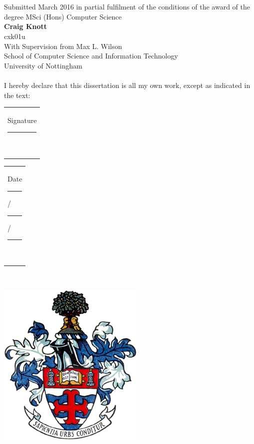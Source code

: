 \begin{center}
\ \\[1cm]
\LARGE{\textbf{\paperTitle}}\ \\[0.5cm]
\large{Submitted March 2016 in partial fulfilment of the conditions of the award of the degree MSci (Hons) Computer Science}
\ \\[1cm]
\large{\textbf{Craig Knott}} \ \\
\large{cxk01u}\ \\[0.3cm]

With Supervision from Max L. Wilson\\[0.3cm]

School of Computer Science and Information Technology \ \\
University of Nottingham \ \\
 \ \\[0.5cm]
I hereby declare that this dissertation is all my own work, except as indicated in the text: \ \\[1cm]
\end{center}

\begin{Large}
\begin{center}
\begin{tabular}{l}
Signature \rule{5cm}{1pt} \ \\[0.2cm]
\end{tabular}
\end{center}

\begin{center}
\begin{tabular}{l}
Date \rule{1.5cm}{1pt}/\rule{1.5cm}{1pt}/\rule{1.5cm}{1pt}\ \\
\end{tabular}
\end{center}
\end{Large}

\ \\[0.6cm]
\begin{center}
\includegraphics[scale=0.55]{images/UoN_Arms}
\end{center}